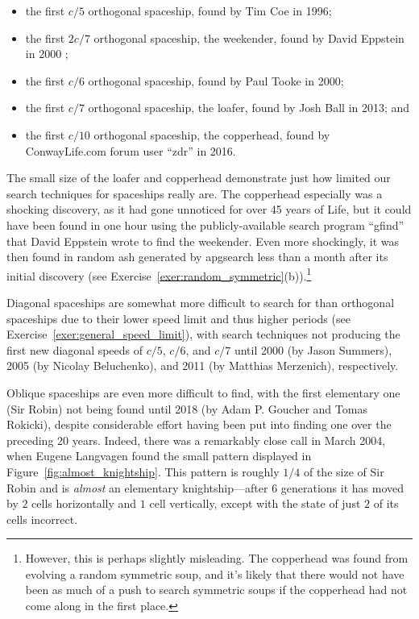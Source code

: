 \begin{itemize}
	\item the first $c/5$ orthogonal spaceship, found by Tim Coe in 1996;\smallskip
	
	\item the first $2c/7$ orthogonal spaceship, the weekender, found by David Eppstein in 2000 \cite{Epp02};\smallskip
	
	\item the first $c/6$ orthogonal spaceship, found by Paul Tooke in 2000;\smallskip
	
	\item the first $c/7$ orthogonal spaceship, the loafer, found by Josh Ball in 2013; and\smallskip
	
	\item the first $c/10$ orthogonal spaceship, the copperhead, found by ConwayLife.com forum user ``zdr'' in 2016.\smallskip
\end{itemize}

The small size of the loafer and copperhead demonstrate just how limited our search techniques for spaceships really are. The copperhead especially was a shocking discovery, as it had gone unnoticed for over 45 years of Life, but it could have been found in one hour using the publicly-available search program ``gfind'' that David Eppstein wrote to find the weekender. Even more shockingly, it was then found in random ash generated by apgsearch less than a month after its initial discovery (see Exercise~\ref{exer:random_symmetric}(b)).\footnote{However, this is perhaps slightly misleading. The copperhead was found from evolving a random symmetric soup, and it's likely that there would not have been as much of a push to search symmetric soups if the copperhead had not come along in the first place.}

Diagonal spaceships are somewhat more difficult to search for than orthogonal spaceships due to their lower speed limit and thus higher periods (see Exercise~\ref{exer:general_speed_limit}), with search techniques not producing the first new diagonal speeds of $c/5$, $c/6$, and $c/7$ until 2000 (by Jason Summers), 2005 (by Nicolay Beluchenko), and 2011 (by Matthias Merzenich), respectively.

Oblique spaceships are even more difficult to find, with the first elementary one (Sir Robin) not being found until 2018 (by Adam P. Goucher and Tomas Rokicki), despite considerable effort having been put into finding one over the preceding 20 years. Indeed, there was a remarkably close call in March 2004, when Eugene Langvagen found the small pattern displayed in Figure~\ref{fig:almost_knightship}. This pattern is roughly $1/4$ of the size of Sir Robin and is \emph{almost} an elementary knightship---after $6$ generations it has moved by $2$ cells horizontally and $1$ cell vertically, except with the state of just $2$ of its cells incorrect.

